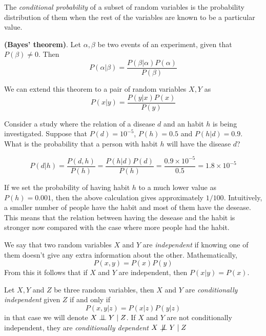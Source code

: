 \begin{definition}
The \emph{conditional probability} of a subset of random variables is the
probability distribution of them when the rest of the variables are known to be
a particular value.
\end{definition}


\begin{theorem}
  \textbf{(Bayes' theorem)}. Let \(\alpha, \beta\) be two events of an
  experiment, given that \(P(\beta) \neq 0\). Then
  \[
  P(\alpha|\beta)= \frac{P(\beta|\alpha)P(\alpha)}{P(\beta)}
\]

We can extend this theorem to a pair of random variables \(X, Y\) as
  \[
  P(x|y)= \frac{P(y|x)P(x)}{P(y)}
\]
\end{theorem}



\begin{exampleth}
Consider a study where the relation of a disease \(d\) and an habit \(h\)
is being investigated. Suppose that \(P(d)=10^{-5}\), \(P(h)=0.5\) and \(P(h|d) = 0.9\). What is the
probability that a person with habit \(h\) will have the disease \(d\)?

\[
P(d|h) = \frac{P(d,h)}{P(h)} = \frac{P(h|d)P(d)}{P(h)} =
\frac{ 0.9 \times 10^{-5}}{ 0.5 } = 1.8 \times 10^{-5}
\]

If we set the probability of having habit \(h\) to a much lower value as \(P(h) =
0.001\), then the above calculation gives approximately \(1/100\). Intuitively, a smaller number of people have the habit and most of them have the
desease. This means that the relation between having the desease and the habit
is stronger now compared with the case where more people had the habit.
\end{exampleth}

\begin{definition}
We say that two random variables \(X\) and \(Y\) are \emph{independent} if knowing one of them doesn't give any extra information about the other. Mathematically,
\[
P(x,y) = P(x)P(y)
\]
From this it follows that if \(X\) and \(Y\) are independent, then \(P(x|y) = P(x)\).
\end{definition}


\begin{definition}
Let \(X,Y\) and \(Z\) be three random variables, then \(X\) and \(Y\) are
\emph{conditionally independent} given \(Z\) if and only if
\[
P(x,y | z) = P(x|z)P(y|z)
\]
in that case we will denote \(X \bigCI Y \mid Z\). If \(X\) and \(Y\) are not
conditionally independent, they are \emph{conditionally dependent} \(X \bigCD Y \mid Z\)

\end{definition}

